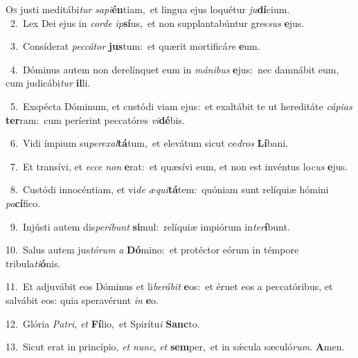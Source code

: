 \lettrine{\initial\textcolor{\initialcolor}{O}}{s} justi meditábi\textit{tur} \textit{sa}\-\textit{pi}\textbf{én}tiam,~\star et lingua ejus loquétur \textit{ju}\-\textbf{dí}cium.\\
{\numbfont\textcolor{\numbcolor}{~2.}}~Lex Dei ejus in \textit{cor}\-\textit{de} \textit{ip}\-\textbf{sí}us,~\star et non supplantabúntur gres\textit{sus} \textbf{e}\-jus.\par
{\numbfont\textcolor{\numbcolor}{~3.}}~Consíderat \textit{pec}\-\textit{cá}\textit{tor} \textbf{jus}\-tum:~\star et quærit mortificá\textit{re} \textbf{e}\-um.\par
{\numbfont\textcolor{\numbcolor}{~4.}}~Dóminus autem non derelínquet eum in \textit{má}\-\textit{ni}\textit{bus} \textbf{e}\-jus:~\star nec damnábit eum, cum judicábi\textit{tur} \textbf{il}\-li.\par
{\numbfont\textcolor{\numbcolor}{~5.}}~Exspécta Dóminum, et custódi viam ejus:~\dagger et exaltábit te ut hereditáte \textit{cá}\-\textit{pi}\textit{as} \textbf{ter}\-ram:~\star cum períerint peccatóres \textit{vi}\-\textbf{dé}bis.\par
{\numbfont\textcolor{\numbcolor}{~6.}}~Vidi ímpium su\-\textit{per}\-\textit{ex}\textit{al}\textbf{tá}tum,~\star et elevátum sicut ce\textit{dros} \textbf{Lí}\-bani.\par
{\numbfont\textcolor{\numbcolor}{~7.}}~Et transívi, et \textit{ec}\-\textit{ce} \textit{non} \textbf{e}\-rat:~\star et quæsívi eum, et non est invéntus lo\textit{cus} \textbf{e}\-jus.\par
{\numbfont\textcolor{\numbcolor}{~8.}}~Custódi innocéntiam, et vi\textit{de} \textit{æ}\-\textit{qui}\textbf{tá}tem:~\star quóniam sunt relíquiæ hómini \textit{pa}\-\textbf{cí}fico.\par
{\numbfont\textcolor{\numbcolor}{~9.}}~Injústi autem dis\-\textit{per}\-\textit{í}\textit{bunt} \textbf{si}\-mul:~\star relíquiæ impiórum in\-\textit{ter}\-\textbf{í}bunt.\par
{\numbfont\textcolor{\numbcolor}{10.}}~Salus autem jus\-\textit{tó}\-\textit{rum} \textit{a} \textbf{Dó}\-mino:~\star et protéctor eórum in témpore tribula\-\textit{ti}\-\textbf{ó}nis.\par
{\numbfont\textcolor{\numbcolor}{11.}}~Et adjuvábit eos Dóminus et li\-\textit{be}\-\textit{rá}\textit{bit} \textbf{e}\-os:~\star et éruet eos a peccatóribus, et salvábit eos: quia speravérunt \textit{in} \textbf{e}\-o.\par
{\numbfont\textcolor{\numbcolor}{12.}}~Glória \textit{Pa}\-\textit{tri}, \textit{et} \textbf{Fí}\-lio,~\star et Spirítu\textit{i} \textbf{Sanc}\-to.\par
{\numbfont\textcolor{\numbcolor}{13.}}~Sicut erat in princípio, \textit{et} \textit{nunc}\-, \textit{et} \textbf{sem}\-per,~\star et in sǽcula sæculó\-\textit{rum}\-. \textbf{A}\-men.\par
